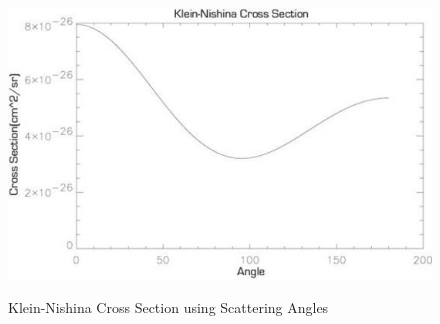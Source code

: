 \documentclass{../lab}
\begin{document}
\begin{enumerate}
    \begin{figure}[h]
        \centering
        \href{http://experimentationlab.berkeley.edu/sites/default/files/images/550px-COMimage013.jpg}{\includegraphics[width=0.7\linewidth]{images/550px-COMimage013.jpg}}
        \caption{Klein-Nishina Cross Section using Scattering Angles}
        \label{fig:550px-COMimage013}
    \end{figure}


\end{enumerate}
\end{document}
